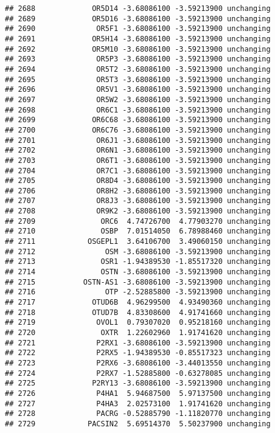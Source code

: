\documentclass[]{article}
\begin{document}
\begin{verbatim}
## 2688             OR5D14 -3.68086100 -3.59213900 unchanging
## 2689             OR5D16 -3.68086100 -3.59213900 unchanging
## 2690              OR5F1 -3.68086100 -3.59213900 unchanging
## 2691             OR5H14 -3.68086100 -3.59213900 unchanging
## 2692             OR5M10 -3.68086100 -3.59213900 unchanging
## 2693              OR5P3 -3.68086100 -3.59213900 unchanging
## 2694              OR5T2 -3.68086100 -3.59213900 unchanging
## 2695              OR5T3 -3.68086100 -3.59213900 unchanging
## 2696              OR5V1 -3.68086100 -3.59213900 unchanging
## 2697              OR5W2 -3.68086100 -3.59213900 unchanging
## 2698              OR6C1 -3.68086100 -3.59213900 unchanging
## 2699             OR6C68 -3.68086100 -3.59213900 unchanging
## 2700             OR6C76 -3.68086100 -3.59213900 unchanging
## 2701              OR6J1 -3.68086100 -3.59213900 unchanging
## 2702              OR6N1 -3.68086100 -3.59213900 unchanging
## 2703              OR6T1 -3.68086100 -3.59213900 unchanging
## 2704              OR7C1 -3.68086100 -3.59213900 unchanging
## 2705              OR8D4 -3.68086100 -3.59213900 unchanging
## 2706              OR8H2 -3.68086100 -3.59213900 unchanging
## 2707              OR8J3 -3.68086100 -3.59213900 unchanging
## 2708              OR9K2 -3.68086100 -3.59213900 unchanging
## 2709               ORC6  4.74726700  4.77903270 unchanging
## 2710               OSBP  7.01514050  6.78988460 unchanging
## 2711            OSGEPL1  3.64106700  3.49060150 unchanging
## 2712                OSM -3.68086100 -3.59213900 unchanging
## 2713               OSR1 -1.94389530 -1.85517320 unchanging
## 2714               OSTN -3.68086100 -3.59213900 unchanging
## 2715           OSTN-AS1 -3.68086100 -3.59213900 unchanging
## 2716                OTP -2.52885800 -3.59213900 unchanging
## 2717             OTUD6B  4.96299500  4.93490360 unchanging
## 2718             OTUD7B  4.83308600  4.91741660 unchanging
## 2719              OVOL1  0.79307020  0.95218160 unchanging
## 2720               OXTR  1.22602960  1.91741620 unchanging
## 2721              P2RX1 -3.68086100 -3.59213900 unchanging
## 2722              P2RX5 -1.94389530 -0.85517323 unchanging
## 2723              P2RX6 -3.68086100 -3.44013550 unchanging
## 2724              P2RX7 -1.52885800 -0.63278085 unchanging
## 2725             P2RY13 -3.68086100 -3.59213900 unchanging
## 2726              P4HA1  5.94687500  5.97137500 unchanging
## 2727              P4HA3  2.02573100  1.91741620 unchanging
## 2728              PACRG -0.52885790 -1.11820770 unchanging
## 2729            PACSIN2  5.69514370  5.50237900 unchanging

\end{verbatim}
\end{document}
